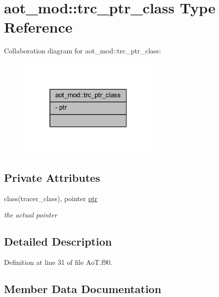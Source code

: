 \hypertarget{structaot__mod_1_1trc__ptr__class}{}\section{aot\+\_\+mod\+:\+:trc\+\_\+ptr\+\_\+class Type Reference}
\label{structaot__mod_1_1trc__ptr__class}


Collaboration diagram for aot\+\_\+mod\+:\+:trc\+\_\+ptr\+\_\+class\+:\nopagebreak
\begin{figure}[H]
\begin{center}
\leavevmode
\includegraphics[width=196pt]{structaot__mod_1_1trc__ptr__class__coll__graph}
\end{center}
\end{figure}
\subsection*{Private Attributes}
\begin{DoxyCompactItemize}
\item 
class(tracer\+\_\+class), pointer \mbox{\hyperlink{structaot__mod_1_1trc__ptr__class_a4cbb6cce7f206152dddb514337040125}{ptr}}
\begin{DoxyCompactList}\small\item\em the actual pointer \end{DoxyCompactList}\end{DoxyCompactItemize}


\subsection{Detailed Description}


Definition at line 31 of file Ao\+T.\+f90.



\subsection{Member Data Documentation}
\mbox{\label{structaot__mod_1_1trc__ptr__class_a4cbb6cce7f206152dddb514337040125}} 
